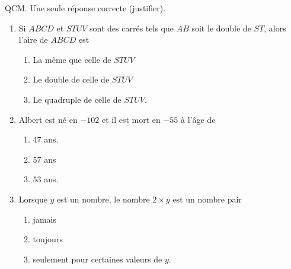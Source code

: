 
\begin{exercice}\label{exo2smath-0324}

    QCM. Une seule réponse correcte (justifier).
    \begin{multicols}{2}
    \begin{enumerate}
        \item
            Si \( ABCD\) et \( STUV\) sont des carrés tels que \( AB\) soit le double de \( ST\), alors l'aire de \( ABCD\) est
            \begin{enumerate}
                \item
                    La même que celle de \( STUV\)
                \item
                    Le double de celle de \( STUV\)
                \item
                    Le quadruple de celle de \( STUV\).
            \end{enumerate}
        \item
            Albert est né en \( -102\) et il est mort en \( -55\) à l'âge de 
            \begin{enumerate}
                \item
            \( 47\) ans.
        \item
            \( 57\) ans
        \item
            \( 53\) ans.
            \end{enumerate}
        \item
            Lorsque \( y\) est un nombre, le nombre \( 2\times y\) est un nombre pair
            \begin{enumerate}
                \item
                    jamais
                \item
                    toujours
                \item
                    seulement pour certaines valeurs de \( y\).
            \end{enumerate}
    \end{enumerate}
    \end{multicols}

\end{exercice}
